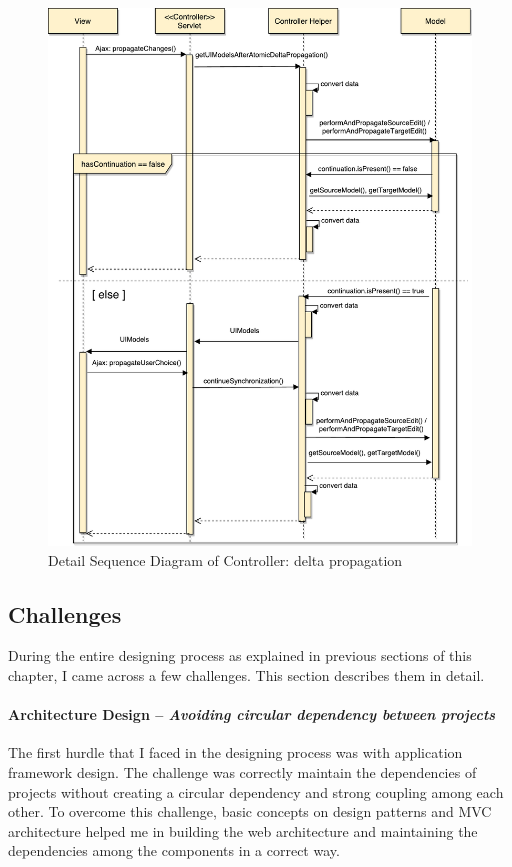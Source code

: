 \begin{figure}
	\includegraphics[width=1\textwidth]{figures/Sequence_Diagram-Controller(delta)}
	\caption{Detail Sequence Diagram of Controller: delta propagation}
	\label{fig:Sequence_Diagram-Controller(delta)}
\end{figure}

\subsection{Challenges}\label{subsec:designchallenges}
During the entire designing process as explained in previous sections of this chapter, I came across a few challenges. This section describes them in detail.

\paragraph{Architecture Design -- \textit{Avoiding circular dependency between projects}}
The first hurdle that I faced in the designing process was with application framework design. The challenge was correctly maintain the dependencies of projects without creating a circular dependency and strong coupling among each other. To overcome this challenge, basic concepts on design patterns and MVC architecture helped me in building the web architecture and maintaining the dependencies among the components in a correct way. 

